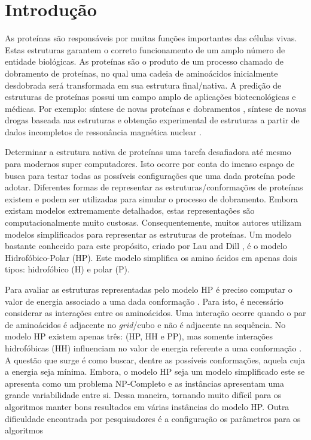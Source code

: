 \chapter{Introdução}

As proteínas são responsáveis por muitas funções importantes das células vivas. Estas estruturas garantem o correto funcionamento de um amplo número de entidade biológicas. As proteínas são o produto de um processo chamado de dobramento de proteínas, no qual uma cadeia de aminoácidos inicialmente desdobrada será transformada em sua estrutura final/nativa. A predição de estruturas de proteínas possui um campo amplo de aplicações biotecnológicas e médicas. Por exemplo: síntese de novas proteínas e dobramentos \cite{wang2012structural, rothlisberger2008kemp}, síntese de novas drogas baseada nas estruturas \cite{qian2004improvement, krieger2009improving}  e obtenção experimental de estruturas a partir de dados incompletos de ressonância magnética nuclear \cite{shen2009novo}.  

Determinar a estrutura nativa de proteínas uma tarefa desafiadora até mesmo para modernos super computadores. Isto ocorre por conta do imenso espaço de busca para testar todas as possíveis configurações que uma dada proteína pode adotar. Diferentes formas de representar as estruturas/conformações de proteínas existem e podem ser utilizadas para simular o processo de dobramento. Embora existam modelos extremamente detalhados, estas representações são computacionalmente muito custosas. Consequentemente, muitos autores \cite{custodio2004investigation,hsu2003growth,lin2011protein,unger1993genetic,santanna2008,custodio2014multiple, garza2012locality} utilizam modelos simplificados para representar as estruturas de proteínas. Um modelo bastante conhecido para este propósito, criado por Lau and Dill \cite{lau1989lattice}, é o modelo Hidrofóbico-Polar (HP). Este modelo simplifica os amino ácidos em apenas dois tipos: hidrofóbico (H) e polar (P). 

Para avaliar as estruturas representadas pelo modelo HP é preciso computar o valor de energia associado a uma dada conformação \cite{unger1993genetic}. Para isto, é necessário considerar as interações entre os aminoácidos. Uma interação ocorre quando o par de aminoácidos é adjacente no \textit{grid}/cubo e não é adjacente na sequência. No modelo HP existem apenas três: (HP, HH e PP), mas somente interações hidrofóbicas (HH) influenciam no valor de energia referente a uma conformação \cite{unger1993genetic}. A questão que surge é como buscar, dentre as possíveis conformações, aquela cuja a energia seja mínima. Embora, o modelo HP seja um modelo simplificado este se apresenta como um problema NP-Completo e as instâncias apresentam uma grande variabilidade entre si. Dessa maneira, tornando muito difícil para os algoritmos manter bons resultados em várias instâncias do modelo HP. Outra dificuldade encontrada por pesquisadores é a configuração os parâmetros para os algoritmos

